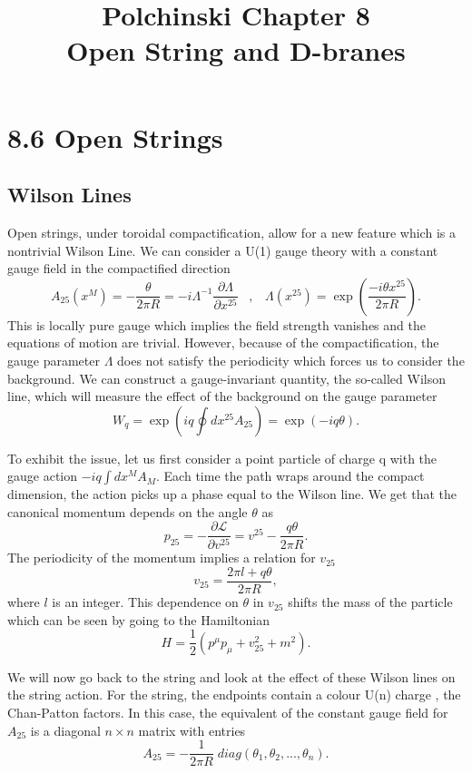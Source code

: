 \documentclass[12pt,letterpaper]{article}
\def\be{\begin{equation}}
\def\ee{\end{equation}}
\begin{document}
\title{Polchinski Chapter 8 \\ Open String and D-branes}
\date{}
\maketitle

\section*{8.6 Open Strings}
\subsection*{Wilson Lines}
Open strings, under toroidal compactification, allow for a new feature which is a nontrivial Wilson Line.  We can consider a U(1) gauge theory with a constant gauge field in the compactified direction
\be
A_{25}(x^{M})=-\frac{\theta}{2\pi R}=-i\Lambda^{-1}\frac{\partial \Lambda}{\partial x^{25}}\;\;\;,\;\;\;\Lambda(x^{25})=\exp{\left(\frac{-i\theta x^{25}}{2\pi R}\right)}.
\ee
This is locally pure gauge which implies the field strength vanishes and the equations of motion are trivial.  However, because of the compactification, the gauge parameter $\Lambda$ does not satisfy the periodicity which forces us to consider the background.  We can construct a gauge-invariant quantity, the so-called Wilson line, which will measure the effect of the background on the gauge parameter
\be
W_{q}=\exp\left(iq\oint dx^{25}A_{25}\right)=\exp(-iq\theta).
\ee


To exhibit the issue, let us first consider a point particle of charge q with the gauge action $-iq\int dx^{M}A_{M}$.  Each time the path wraps around the compact dimension, the action picks up a phase equal to the Wilson line.  We get that the canonical momentum depends on the angle $\theta$ as
\be
p_{25}=-\frac{\partial \mathcal{L}}{\partial v^{25}}=v^{25}-\frac{q\theta}{2\pi R}.
\ee
The periodicity of the momentum implies a relation for $v_{25}$
\be
v_{25}=\frac{2\pi l+q\theta}{2\pi R},
\ee
where $l$ is an integer.  This dependence on $\theta$ in $v_{25}$ shifts the mass of the particle which can be seen by going to the Hamiltonian
\be
H=\frac{1}{2}\left(p^{\mu}p_{\mu}+v^{2}_{25}+m^{2}\right).
\ee

We will now go back to the string and look at the effect of these Wilson lines on the string action.  For the string, the endpoints contain a colour U(n) charge , the Chan-Patton factors.  In this case, the equivalent of the constant gauge field for $A_{25}$ is a diagonal $n\times n$ matrix with entries
\be
A_{25}= -\frac{1}{2\pi R}\;diag\left(\theta_{1},\theta_{2},...,\theta_{n}\right).
\ee
\end{document}
